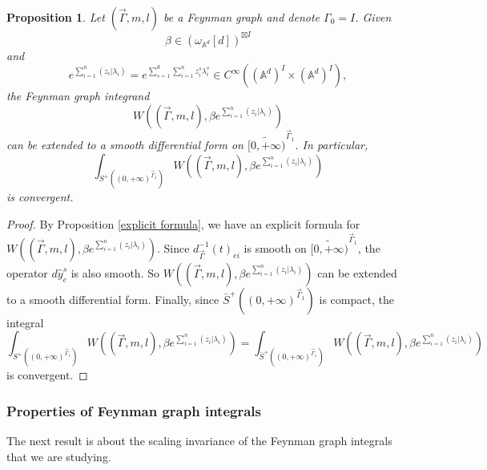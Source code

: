 \documentclass[11pt]{amsart}
\newtheorem{prop}[thm]{Proposition}
\theoremstyle{definition}
\theoremstyle{remark}
\numberwithin{equation}{section}
\begin{document}
\begin{prop}
    Let $(\vec{\Gamma},m,l)$ be a Feynman graph and denote $\Gamma_{0}= I$.
    Given
    $$
    \beta\in (\omega_{\mathbb{A}^{d}}[d])^{\boxtimes I}
    $$
    and
    $$
    e^{\sum\limits_{i=1}^{n}(z_{i}|\lambda_{i})}=e^{\sum\limits_{s=1}^{d}\sum\limits_{i=1}^{n}z^{s}_{i}\lambda^{s}_{i}}\in C^{\infty}((\mathbb{A}^{d})^{ I}\times (\mathbb{A}^{d})^{ I}),
    $$
    the Feynman graph integrand
    $$
    W((\vec{\Gamma},m,l),\beta e^{\sum\limits_{i=1}^{n}(z_{i}|\lambda_{i})})
    $$
    can be extended to a smooth differential form on $\widetilde{[0,+\infty)}^{\vec{\Gamma}_{1}}$. In particular,
    $$
    \int_{S^{+}((0,+\infty)^{\vec{\Gamma}_{1}})}W((\vec{\Gamma},m,l),\beta e^{\sum\limits_{i=1}^{n}(z_{i}|\lambda_{i})})
    $$
    is convergent.
\end{prop}
\begin{proof}
    By Proposition \ref{explicit formula}, we have an explicit formula for $
    W((\vec{\Gamma},m,l),\beta e^{\sum\limits_{i=1}^{n}(z_{i}|\lambda_{i})})
    $. Since $d^{-1}_{\vec{\Gamma}}(t)_{ei}$ is smooth on $\widetilde{[0,+\infty)}^{\vec{\Gamma}_{1}}$, the operator $d\hat{y}_{e}^{s}$ is also smooth. So $
    W((\vec{\Gamma},m,l),\beta e^{\sum\limits_{i=1}^{n}(z_{i}|\lambda_{i})})
    $ can be extended to a smooth differential form. Finally, since $\bar{S}^{+}((0,+\infty)^{\vec{\Gamma}_{1}})$ is compact, the integral
    $$
    \int_{S^{+}((0,+\infty)^{\vec{\Gamma}_{1}})}W((\vec{\Gamma},m,l),\beta e^{\sum\limits_{i=1}^{n}(z_{i}|\lambda_{i})})=
    \int_{\bar{S}^{+}((0,+\infty)^{\vec{\Gamma}_{1}})}W((\vec{\Gamma},m,l),\beta e^{\sum\limits_{i=1}^{n}(z_{i}|\lambda_{i})})
    $$
    is convergent.
\end{proof}

\subsubsection{Properties of Feynman graph integrals}

The next result is about the scaling invariance of the Feynman graph integrals that we are studying.
\end{document}
